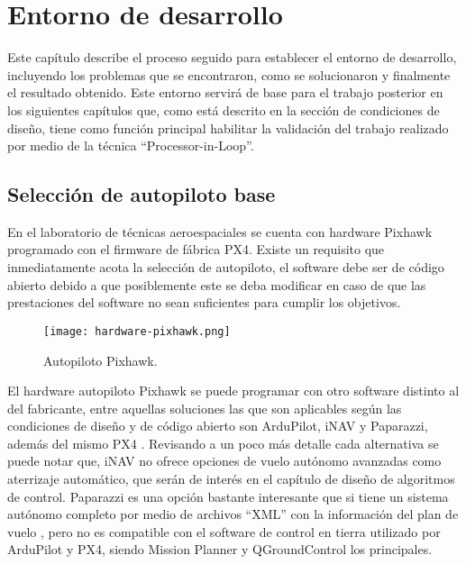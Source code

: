 \chapter{Entorno de desarrollo}

Este capítulo describe el proceso seguido para establecer el entorno de desarrollo, incluyendo los problemas que se encontraron, como se solucionaron y finalmente el resultado obtenido. Este entorno servirá de base para el trabajo posterior en los siguientes capítulos que, como está descrito en la sección de condiciones de diseño, tiene como función principal habilitar la validación del trabajo realizado por medio de la técnica ``Processor-in-Loop''.

\section{Selección de autopiloto base}

En el laboratorio de técnicas aeroespaciales se cuenta con hardware Pixhawk programado con el firmware de fábrica PX4. Existe un requisito que inmediatamente acota la selección de autopiloto, el software debe ser de código abierto debido a que posiblemente este se deba modificar en caso de que las prestaciones del software no sean suficientes para cumplir los objetivos.

\begin{figure}[h]
    \centering
    \texttt{[image: hardware-pixhawk.png]}
    \caption[Autopiloto Pixhawk.]{Autopiloto Pixhawk.\footnotemark}
    \label{fig:pixhawk1}
\end{figure}

El hardware autopiloto Pixhawk se puede programar con otro software distinto al del fabricante, entre aquellas soluciones las que son aplicables según las condiciones de diseño y de código abierto son ArduPilot, iNAV y Paparazzi, además del mismo PX4 \cite{survey}. Revisando a un poco más detalle cada alternativa se puede notar que, iNAV no ofrece opciones de vuelo autónomo avanzadas como aterrizaje automático, que serán de interés en el capítulo de diseño de algoritmos de control. Paparazzi es una opción bastante interesante que si tiene un sistema autónomo completo por medio de archivos ``XML'' con la información del plan de vuelo \cite{paparazzi_flight_plan}, pero no es compatible con el software de control en tierra utilizado por ArduPilot y PX4, siendo Mission Planner y QGroundControl los principales.

